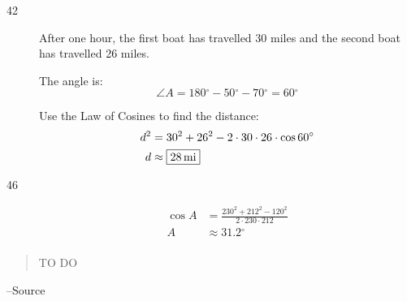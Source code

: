\documentclass{exam}
\newcommand{\dg}{\ensuremath{^\circ}}
\begin{document}
\begin{description}
      \item[42]
        After one hour, the first boat has travelled 30 miles and the second boat has travelled 26 miles.

        The angle is:
        \[
          \angle A = 180 \dg - 50 \dg - 70 \dg = 60 \dg
        \]

        Use the Law of Cosines to find the distance:
        \begin{align*}
          d^2 & = 30^2 + 26^2 - 2 \cdot 30 \cdot 26 \cdot \cos 60 \dg \\
          d   & \approx \boxed{ \unit[28]{mi} } \\
        \end{align*}

      \item[46]
        \begin{align*}
          \cos A & = \frac{230^2 + 212^2 - 120^2}{2 \cdot 230 \cdot 212} \\
          A      & \approx 31.2 \dg \\
        \end{align*}

    \end{description}

  \else
    \vspace{1 cm}
    \begin{quote}
      \begin{em}
        TO DO
      \end{em}
    \end{quote}
    \hspace{1 cm} --Source
  \fi
\end{document}
